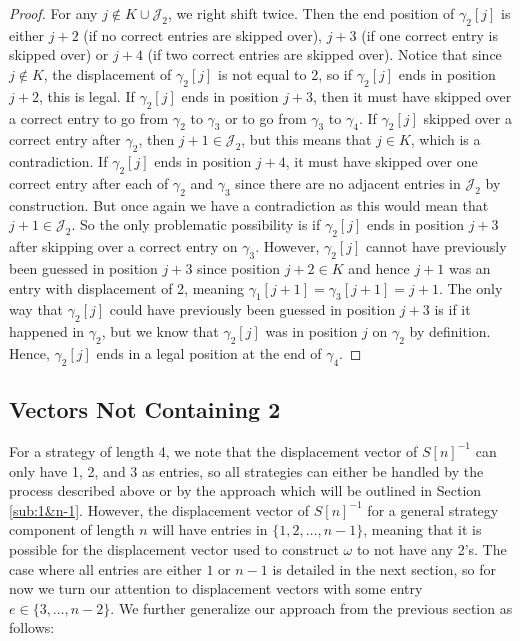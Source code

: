 \documentclass[article]{amsart}
\theoremstyle{plain}
\begin{document}
\begin{proof}
    For any $j \notin K \cup \mathcal{J}_2$, we right shift twice. Then the end position of $\gamma_2[j]$ is either $j+2$ (if no correct entries are skipped over), $j+3$ (if one correct entry is skipped over) or $j+4$ (if two correct entries are skipped over). Notice that since $j \notin K$, the displacement of $\gamma_2[j]$ is not equal to 2, so if $\gamma_2[j]$ ends in position $j+2$, this is legal. If $\gamma_2[j]$ ends in position $j+3$, then it must have skipped over a correct entry to go from $\gamma_2$ to $\gamma_3$ or to go from $\gamma_3$ to $\gamma_4$. If $\gamma_2[j]$ skipped over a correct entry after $\gamma_2$, then $j+1 \in \mathcal{J}_2$, but this means that $j \in K$, which is a contradiction. If $\gamma_2[j]$ ends in position $j+4$, it must have skipped over one correct entry after each of $\gamma_2$ and $\gamma_3$ since there are no adjacent entries in $\mathcal{J}_2$ by construction. But once again we have a contradiction as this would mean that $j+1 \in \mathcal{J}_2$. So the only problematic possibility is if $\gamma_2[j]$ ends in position $j+3$ after skipping over a correct entry on $\gamma_3$. However, $\gamma_2[j]$ cannot have previously been guessed in position $j+3$ since position $j+2 \in K$ and hence $j+1$ was an entry with displacement of 2, meaning $\gamma_1 [j+1] = \gamma_3 [j+1] = j+1$. The only way that $\gamma_2[j]$ could have previously been guessed in position $j+3$ is if it happened in $\gamma_2$, but we know that $\gamma_2[j]$ was in position $j$ on $\gamma_2$ by definition. Hence, $\gamma_2[j]$ ends in a legal position at the end of $\gamma_4$.  
\end{proof}



\subsection{Vectors Not Containing 2} \label{sub:no2s}

For a strategy of length 4, we note that the displacement vector of $S[n]^{-1}$ can only have 1, 2, and 3 as entries, so all strategies can either be handled by the process described above or by the approach which will be outlined in Section \ref{sub:1&n-1}. However, the displacement vector of $S[n]^{-1}$ for a general strategy component of length $n$ will have entries in $\{1,2,\dots,n-1\}$, meaning that it is possible for the displacement vector used to construct $\omega$ to not have any 2's. The case where all entries are either $1$ or $n-1$ is detailed in the next section, so for now we turn our attention to displacement vectors with some entry $e \in \{3,\dots,n-2\}$. We further generalize our approach from the previous section as follows:
\end{document}
